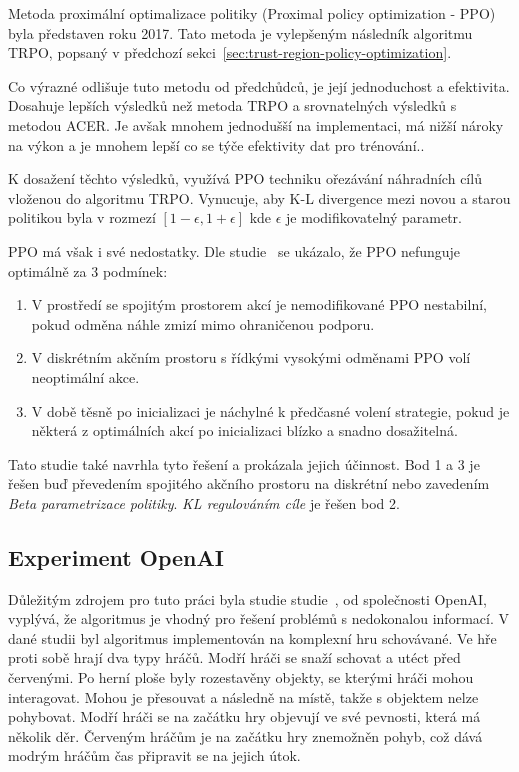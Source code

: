
Metoda proximální optimalizace politiky (Proximal policy optimization - PPO) byla představen roku 2017\cite{PPO_paper}.
Tato metoda je vylepšeným následník algoritmu TRPO, popsaný v předchozí sekci~\ref{sec:trust-region-policy-optimization}.

Co výrazné odlišuje tuto metodu od předchůdců, je její jednoduchost a efektivita.
Dosahuje lepších výsledků než metoda TRPO a srovnatelných výsledků s metodou ACER.
Je avšak mnohem jednodušší na implementaci, má nižší nároky na výkon a je mnohem lepší co se týče efektivity dat pro trénování.\cite{PPO_paper}.

K dosažení těchto výsledků, využívá PPO techniku ořezávání náhradních cílů vloženou do algoritmu TRPO\@.
Vynucuje, aby K-L divergence mezi novou a starou politikou byla v rozmezí $[1-\epsilon, 1+\epsilon]$ kde $\epsilon$ je modifikovatelný parametr.

PPO má však i své nedostatky.
\label{PPO_weakness}
Dle studie~\cite{PPO_weakness} se ukázalo, že PPO nefunguje optimálně za 3 podmínek:
\begin{enumerate}
  \item V prostředí se spojitým prostorem akcí je nemodifikované PPO nestabilní, pokud odměna náhle zmizí mimo ohraničenou podporu.
  \item V diskrétním akčním prostoru s řídkými vysokými odměnami PPO volí neoptimální akce.
  \item V době těsně po inicializaci je náchylné k předčasné volení strategie, pokud je některá z optimálních akcí po inicializaci blízko a snadno dosažitelná.
\end{enumerate}

Tato studie také navrhla tyto řešení a prokázala jejich účinnost.
Bod 1 a 3 je řešen buď převedením spojitého akčního prostoru na diskrétní nebo zavedením \emph{Beta parametrizace politiky}.
\emph{KL regulováním cíle} je řešen bod 2.

\subsection{Experiment OpenAI}\label{subsec:experiment-openai}
Důležitým zdrojem pro tuto práci byla studie studie~\cite{PPO_Hide_Seek_paper}, od společnosti OpenAI, vyplývá, že algoritmus je vhodný pro řešení problémů s nedokonalou informací.
V dané studii byl algoritmus implementován na komplexní hru schovávané.
Ve hře proti sobě hrají dva typy hráčů.
Modří hráči se snaží schovat a utéct před červenými.
Po herní ploše byly rozestavěny objekty, se kterými hráči mohou interagovat.
Mohou je přesouvat a následně  na místě, takže s objektem nelze pohybovat.
Modří hráči se na začátku hry objevují ve své pevnosti, která má několik děr.
Červeným hráčům je na začátku hry znemožněn pohyb, což dává modrým hráčům čas připravit se na jejich útok.


